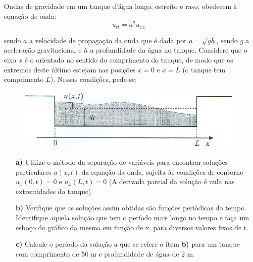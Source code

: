 \linespread{1.5}
Ondas de gravidade em um tanque d'água longo, estreito e raso, obedecem à equação de onda:
\begin{equation*}
    u_{tt} = a^2u_{xx}
\end{equation*}

sendo $a$ a velocidade de propagação da onda que é dada por $a = \sqrt{gh}$, sendo $g$ a aceleração gravitacional e $h$ a profundidade da água no tanque. Considere que o eixo $x$ é o orientado no sentido do comprimento do tanque, de modo que os extremos deste último estejam nas posições $x = 0$ e $x = L$ (o tanque tem comprimento $L$). Nessas condições, pede-se:
\begin{figure}[H]
    \centering
    \includegraphics[width=0.5\linewidth]{fig/edp.png}
\end{figure}

\begin{itemize}
    \item[\textbf{a)}] Utilize o método da separação de variáveis para encontrar soluções particulares $u(x, t)$ da equação da onda, sujeita às condições de contorno $u_x(0, t) = 0$ e $u_x(L,t) = 0$ (A derivada parcial da solução é nula nas extremidades do tanque).
    \item[\textbf{b)}] Verifique que as soluções assim obtidas são funções periódicas do tempo. Identifique aquela solução que tem o período mais longo no tempo e faça um esboço do gráfico da mesma em função de x, para diversos valores fixos de t.
    \item[\textbf{c)}]Calcule o período da solução a que se refere o item \textbf{b)} para um tanque com comprimento de 50 m e profundidade de água de 2 m.
\end{itemize}